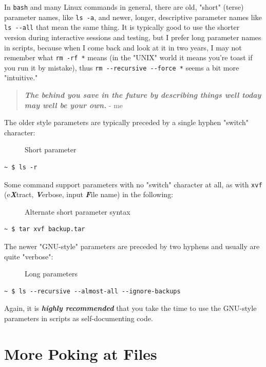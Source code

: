 \documentclass[10pt,]{book}
\numberwithin{figure}{chapter}
\DeclareRobustCommand{\drcap}[1]{\begin{figure}[H]\caption{#1}\end{figure}}
\DeclareRobustCommand{\drcmd}[1]{\index{Commands!#1}}
\begin{document}
In \texttt{bash} and many Linux commands in general, there are old,
"short" (terse) parameter names, like \texttt{ls -a}, and newer, longer,
descriptive parameter names like \texttt{ls -{}-all} that mean the same
thing. It is typically good to use the shorter version during
interactive sessions and testing, but I prefer long parameter names in
scripts, because when I come back and look at it in two years, I may not
remember what \texttt{rm -rf *}\drcmd{rm} means (in the "UNIX" world it
means you're toast if you run it by mistake), thus
\texttt{rm -{}-recursive -{}-force *} seems a bit more "intuitive."

\begin{quote}
\textbf{\emph{The behind you save in the future by describing things
well today may well be your own.}} - me
\end{quote}

The older style parameters are typically preceded by a single hyphen
"switch" character:

\drcap{Short parameter}

\begin{verbatim}
~ $ ls -r
\end{verbatim}

Some command support parameters with no "switch" character at all, as
with \texttt{xvf} (e\textbf{\emph{X}}tract, \textbf{\emph{V}}erbose,
input \textbf{\emph{F}}ile name) in the following:

\drcap{Alternate short parameter syntax}

\begin{verbatim}
~ $ tar xvf backup.tar
\end{verbatim}

The newer "GNU-style" parameters are preceded by two hyphens and usually
are quite "verbose":

\drcap{Long parameters}

\begin{verbatim}
~ $ ls --recursive --almost-all --ignore-backups
\end{verbatim}

Again, it is \textbf{\emph{highly recommended}} that you take the time
to use the GNU-style parameters in scripts as self-documenting code.

\section*{More Poking at Files}\label{more-poking-at-files}
\end{document}

